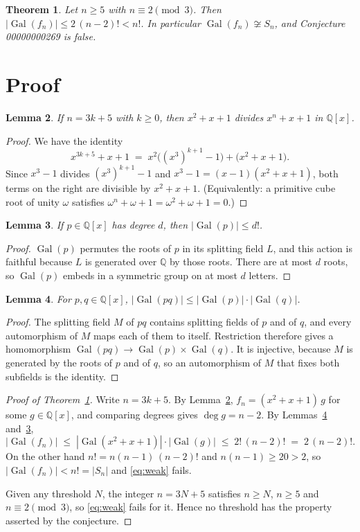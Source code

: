\documentclass[11pt]{article}
\theoremstyle{plain}
\newtheorem{theorem}{Theorem}
\newtheorem{lemma}[theorem]{Lemma}
\theoremstyle{remark}
\DeclareMathOperator{\Gal}{Gal}
\begin{document}
\begin{theorem}\label{thm:main}
Let $n\ge5$ with $n\equiv2\pmod 3$. Then $|\Gal(f_n)|\le 2\,(n-2)!<n!$. In
particular $\Gal(f_n)\not\cong S_n$, and Conjecture 00000000269 is false.
\end{theorem}

\section{Proof}

\begin{lemma}\label{lem:dvd}
If $n=3k+5$ with $k\ge0$, then $x^2+x+1$ divides $x^n+x+1$ in $\mathbb Q[x]$.
\end{lemma}

\begin{proof}
We have the identity
\[
  x^{3k+5}+x+1 \;=\; x^2\bigl((x^3)^{k+1}-1\bigr)+\bigl(x^2+x+1\bigr).
\]
Since $x^3-1$ divides $(x^3)^{k+1}-1$ and $x^3-1=(x-1)(x^2+x+1)$, both terms on
the right are divisible by $x^2+x+1$. (Equivalently: a primitive cube root of
unity $\omega$ satisfies $\omega^n+\omega+1=\omega^2+\omega+1=0$.)
\end{proof}

\begin{lemma}\label{lem:deg}
If $p\in\mathbb Q[x]$ has degree $d$, then $|\Gal(p)|\le d!$.
\end{lemma}

\begin{proof}
$\Gal(p)$ permutes the roots of $p$ in its splitting field $L$, and this action
is faithful because $L$ is generated over $\mathbb Q$ by those roots. There are
at most $d$ roots, so $\Gal(p)$ embeds in a symmetric group on at most $d$
letters.
\end{proof}

\begin{lemma}\label{lem:prod}
For $p,q\in\mathbb Q[x]$, $|\Gal(pq)|\le|\Gal(p)|\cdot|\Gal(q)|$.
\end{lemma}

\begin{proof}
The splitting field $M$ of $pq$ contains splitting fields of $p$ and of $q$,
and every automorphism of $M$ maps each of them to itself. Restriction
therefore gives a homomorphism $\Gal(pq)\to\Gal(p)\times\Gal(q)$. It is
injective, because $M$ is generated by the roots of $p$ and of $q$, so an
automorphism of $M$ that fixes both subfields is the identity.
\end{proof}

\begin{proof}[Proof of Theorem~\ref{thm:main}]
Write $n=3k+5$. By Lemma~\ref{lem:dvd}, $f_n=(x^2+x+1)\,g$ for some
$g\in\mathbb Q[x]$, and comparing degrees gives $\deg g=n-2$. By
Lemmas~\ref{lem:prod} and~\ref{lem:deg},
\[
  |\Gal(f_n)|\;\le\;|\Gal(x^2+x+1)|\cdot|\Gal(g)|\;\le\;2!\,(n-2)!\;=\;2\,(n-2)!.
\]
On the other hand $n!=n(n-1)\,(n-2)!$ and $n(n-1)\ge20>2$, so
$|\Gal(f_n)|<n!=|S_n|$ and \eqref{eq:weak} fails.

Given any threshold $N$, the integer $n=3N+5$ satisfies $n\ge N$, $n\ge5$ and
$n\equiv2\pmod3$, so \eqref{eq:weak} fails for it. Hence no threshold has the
property asserted by the conjecture.
\end{proof}
\end{document}
